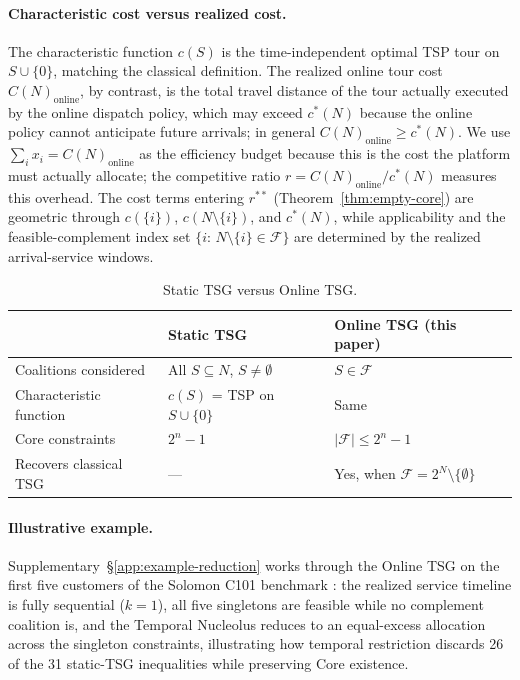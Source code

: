 \documentclass[11pt]{article}
\theoremstyle{plain}
\theoremstyle{definition}
\theoremstyle{remark}
\newcommand{\F}{\mathcal{F}}
\newcommand{\cstar}{c^{\ast}}
\begin{document}
\paragraph{Characteristic cost versus realized cost.} The characteristic function $c(S)$ is the time-independent optimal TSP tour on $S\cup\{0\}$, matching the classical \citet{potters1992tsg} definition. The realized online tour cost $C(N)_{\text{online}}$, by contrast, is the total travel distance of the tour actually executed by the online dispatch policy, which may exceed $\cstar(N)$ because the online policy cannot anticipate future arrivals; in general $C(N)_{\text{online}} \ge \cstar(N)$. We use $\sum_i x_i = C(N)_{\text{online}}$ as the efficiency budget because this is the cost the platform must actually allocate; the competitive ratio $r = C(N)_{\text{online}}/\cstar(N)$ measures this overhead. The cost terms entering $r^{\ast\ast}$ (Theorem~\ref{thm:empty-core}) are geometric through $c(\{i\})$, $c(N\setminus\{i\})$, and $\cstar(N)$, while applicability and the feasible-complement index set $\{i:\,N\setminus\{i\}\in\F\}$ are determined by the realized arrival-service windows.

\begin{table}[t]
\centering
\caption{Static TSG versus Online TSG.}
\label{tab:static-vs-temporal}
\small
\begin{tabular}{@{}lll@{}}
\toprule
 & Static TSG \citep{potters1992tsg} & Online TSG (this paper) \\
\midrule
Coalitions considered & All $S\subseteq N$, $S\neq\emptyset$ & $S\in\F$ \\
Characteristic function & $c(S)$ = TSP on $S\cup\{0\}$ & Same \\
Core constraints & $2^n-1$ & $|\F|\le 2^n-1$ \\
Recovers classical TSG & --- & Yes, when $\F=2^N\setminus\{\emptyset\}$ \\
\bottomrule
\end{tabular}
\end{table}

\paragraph{Illustrative example.} Supplementary~\S\ref{app:example-reduction} works through the Online TSG on the first five customers of the Solomon C101 benchmark \citep{solomon1987benchmarks}: the realized service timeline is fully sequential ($k=1$), all five singletons are feasible while no complement coalition is, and the Temporal Nucleolus reduces to an equal-excess allocation across the singleton constraints, illustrating how temporal restriction discards 26 of the 31 static-TSG inequalities while preserving Core existence.
\end{document}
